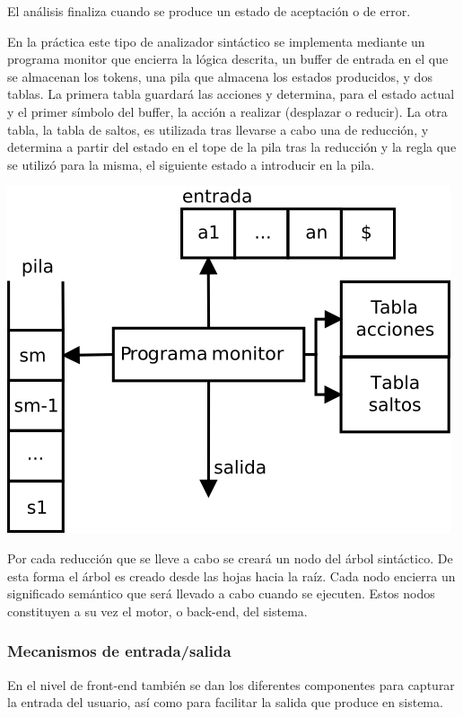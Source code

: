 El análisis finaliza cuando se produce un estado de aceptación o de error. 

En la práctica este tipo de analizador sintáctico se implementa mediante un programa monitor que encierra la lógica descrita, un buffer de entrada en el que se almacenan
los tokens, una pila que almacena los estados producidos, y dos tablas. La primera tabla guardará las acciones y determina, para el estado actual y el primer símbolo del buffer, 
la acción a realizar (desplazar o reducir). La otra tabla, la tabla de saltos, es utilizada tras llevarse a cabo una de reducción, y determina a partir del estado en el tope de la pila
tras la reducción y la regla que se utilizó para la misma, el siguiente estado a introducir en la pila. 

\begin{center}
\includegraphics[scale=0.7]{dia/asd.png} \\
\end{center}

Por cada reducción que se lleve a cabo se creará un nodo del árbol sintáctico. De esta forma el árbol es creado desde las hojas hacia la raíz. Cada nodo encierra un significado semántico que 
será llevado a cabo cuando se ejecuten. Estos nodos constituyen a su vez el motor, o back-end, del sistema.

\subsubsection{Mecanismos de entrada/salida}
En el nivel de front-end también se dan los diferentes componentes para capturar la entrada del usuario, así como para facilitar la salida que produce en sistema.

